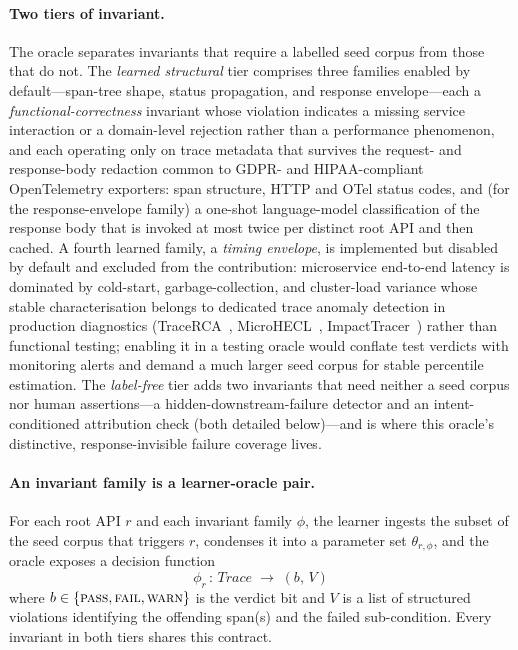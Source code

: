 \documentclass[conference]{IEEEtran}
\begin{document}
\paragraph{Two tiers of invariant.}
The oracle separates invariants that require a labelled seed corpus from those that do not.  The \emph{learned structural} tier comprises three families enabled by default---span-tree shape, status propagation, and response envelope---each a \emph{functional-correctness} invariant whose violation indicates a missing service interaction or a domain-level rejection rather than a performance phenomenon, and each operating only on trace metadata that survives the request- and response-body redaction common to GDPR- and HIPAA-compliant OpenTelemetry exporters: span structure, HTTP and OTel status codes, and (for the response-envelope family) a one-shot language-model classification of the response body that is invoked at most twice per distinct root API and then cached.  A fourth learned family, a \emph{timing envelope}, is implemented but disabled by default and excluded from the contribution: microservice end-to-end latency is dominated by cold-start, garbage-collection, and cluster-load variance whose stable characterisation belongs to dedicated trace anomaly detection in production diagnostics (TraceRCA~\cite{li2021tracerca}, MicroHECL~\cite{liu2021microhecl}, ImpactTracer~\cite{xie2023impacttracer}) rather than functional testing; enabling it in a testing oracle would conflate test verdicts with monitoring alerts and demand a much larger seed corpus for stable percentile estimation.  The \emph{label-free} tier adds two invariants that need neither a seed corpus nor human assertions---a hidden-downstream-failure detector and an intent-conditioned attribution check (both detailed below)---and is where this oracle's distinctive, response-invisible failure coverage lives.

\paragraph{An invariant family is a learner-oracle pair.}
For each root API $r$ and each invariant family $\phi$, the learner ingests the subset of the seed corpus that triggers $r$, condenses it into a parameter set $\theta_{r,\phi}$, and the oracle exposes a decision function
\[
  \phi_{r}\,:\, \mathit{Trace} \;\to\; (b,\,V)
\]
where $b \in \{\textsc{pass}, \textsc{fail}, \textsc{warn}\}$ is the verdict bit and $V$ is a list of structured violations identifying the offending span(s) and the failed sub-condition. Every invariant in both tiers shares this contract.
\end{document}
